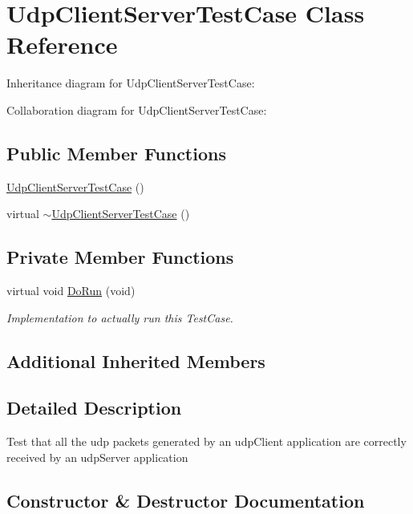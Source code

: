 \hypertarget{classUdpClientServerTestCase}{}\section{Udp\+Client\+Server\+Test\+Case Class Reference}
\label{classUdpClientServerTestCase}


Inheritance diagram for Udp\+Client\+Server\+Test\+Case\+:


Collaboration diagram for Udp\+Client\+Server\+Test\+Case\+:
\subsection*{Public Member Functions}
\begin{DoxyCompactItemize}
\item 
\hyperlink{classUdpClientServerTestCase_a1a0f66d6b333698fc5bf85b2fba14590}{Udp\+Client\+Server\+Test\+Case} ()
\item 
virtual \hyperlink{classUdpClientServerTestCase_a68cddbe833f7c0d6cc3f1cb45428eacc}{$\sim$\+Udp\+Client\+Server\+Test\+Case} ()
\end{DoxyCompactItemize}
\subsection*{Private Member Functions}
\begin{DoxyCompactItemize}
\item 
virtual void \hyperlink{classUdpClientServerTestCase_a9f7f382020c2a70d7cb2434ae18c9b6c}{Do\+Run} (void)
\begin{DoxyCompactList}\small\item\em Implementation to actually run this Test\+Case. \end{DoxyCompactList}\end{DoxyCompactItemize}
\subsection*{Additional Inherited Members}


\subsection{Detailed Description}
Test that all the udp packets generated by an udp\+Client application are correctly received by an udp\+Server application 

\subsection{Constructor \& Destructor Documentation}
